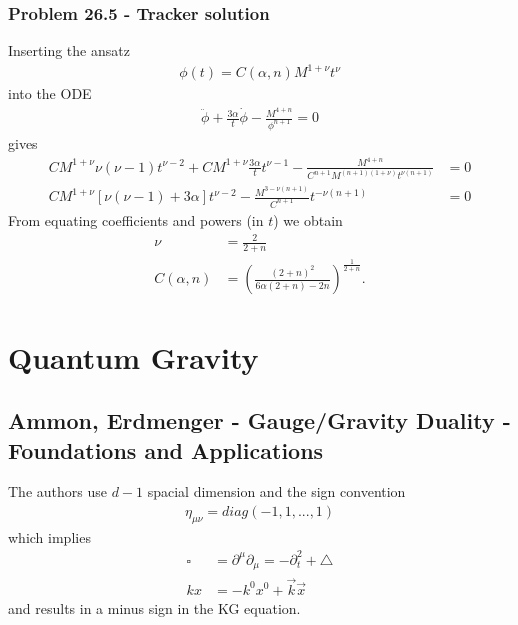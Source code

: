 \documentclass[10pt,a4paper]{article}
\theoremstyle{definition}
\begin{document}
\subsubsection{Problem 26.5 - Tracker solution}
Inserting the ansatz
\begin{align}
    \phi(t)=C(\alpha,n)M^{1+\nu}t^\nu
\end{align}
into the ODE
\begin{align}
    \ddot\phi+\frac{3\alpha}{t}\dot\phi-\frac{M^{4+n}}{\phi^{n+1}}=0
\end{align}
gives
\begin{align}
    CM^{1+\nu}\nu(\nu-1)t^{\nu-2}+CM^{1+\nu}\frac{3\alpha}{t}t^{\nu-1}-\frac{M^{4+n}}{C^{n+1}M^{(n+1)(1+\nu)}t^{\nu(n+1)}}&=0\\
    CM^{1+\nu}\left[\nu(\nu-1)+3\alpha\right]t^{\nu-2}-\frac{M^{3-\nu(n+1)}}{C^{n+1}}t^{-\nu(n+1)}&=0
\end{align}
From equating coefficients and powers (in $t$) we obtain
\begin{align}
    \nu&=\frac{2}{2+n}\\
    C(\alpha,n)&=\left(\frac{(2+n)^2}{6\alpha(2+n)-2n}\right)^\frac{1}{2+n}.
\end{align}

\newpage
\section{Quantum Gravity}
\subsection{{\sc Ammon, Erdmenger} - Gauge/Gravity Duality - Foundations and Applications}
The authors use $d-1$ spacial dimension and the sign convention 
\begin{align}
\eta_{\mu\nu}=diag(-1,1,...,1)
\end{align}
which implies 
\begin{align}
    \square&=\partial^\mu\partial_\mu=-\partial_t^2+\triangle\\
    kx&=-k^0x^0+\vec{k}\vec{x}
\end{align}
and results in a minus sign in the KG equation.
\end{document}
